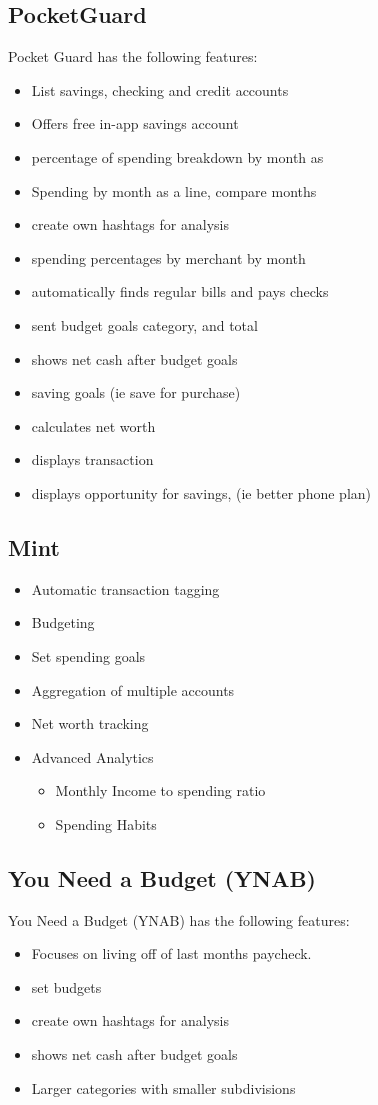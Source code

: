 \documentclass[12pt]{article}
\begin{document}
\subsection{PocketGuard}
Pocket Guard has the following features:
\begin{itemize}
    \item List savings, checking and credit accounts
    \item Offers free in-app savings account
    \item percentage of spending breakdown by month as 
    \item Spending by month as a line, compare months
    \item create own hashtags for analysis
    \item spending percentages by merchant by month
    \item automatically finds regular bills and pays checks
    \item sent budget goals category, and total
    \item shows net cash after budget goals
    \item saving goals (ie save for purchase)
    \item calculates net worth
    \item displays transaction
    \item displays opportunity for savings, (ie better phone plan)
\end{itemize}
    
\subsection{Mint}
\begin{itemize}
    \item Automatic transaction tagging
    \item Budgeting
    \item Set spending goals
    \item Aggregation of multiple accounts
    \item Net worth tracking
    \item Advanced Analytics
    \begin{itemize}
        \item Monthly Income to spending ratio
        \item Spending Habits
    \end{itemize}
\end{itemize}
\subsection{You Need a Budget (YNAB)}
You Need a Budget (YNAB) has the following features:
\begin{itemize}
    \item Focuses on living off of last months paycheck.
    \item set budgets
    \item create own hashtags for analysis
    \item shows net cash after budget goals
    \item Larger categories with smaller subdivisions
\end{itemize}
\end{document}
